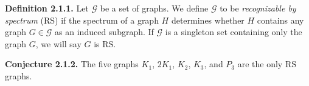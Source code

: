 
\textbf{Definition 2.1.1.} Let $\mathcal{G}$ be a set of graphs. We define
$\mathcal{G}$ to be \emph{recognizable by spectrum} (RS) if the spectrum of
a graph $H$ determines whether $H$ contains any graph $G\in\mathcal{G}$
as an induced subgraph. If $\mathcal{G}$ is a singleton set containing
only the graph $G$, we will say $G$ is RS.

\textbf{Conjecture 2.1.2.} The five graphs $K_1$, $2K_1$, $K_2$, $K_3$,
and $P_3$ are the only RS graphs.
